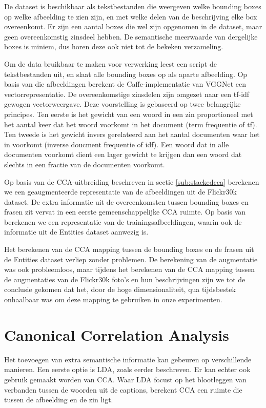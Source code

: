 De dataset is beschikbaar als tekstbestanden die weergeven welke bounding boxes op welke afbeelding te zien zijn, en met welke delen van de beschrijving elke box overeenkomt. Er zijn een aantal boxes die wel zijn opgenomen in de dataset, maar geen overeenkomstig zinsdeel hebben. De semantische meerwaarde van dergelijke boxes is miniem, dus horen deze ook niet tot de bekeken verzameling. 

Om de data bruikbaar te maken voor verwerking leest een script de tekstbestanden uit, en slaat alle bounding boxes op als aparte afbeelding. Op basis van die afbeeldingen berekent de Caffe-implementatie van VGGNet een vectorrepresentatie. De overeenkomstige zinsdelen zijn omgezet naar een tf-idf gewogen vectorweergave. Deze voorstelling is gebaseerd op twee belangrijke principes. Ten eerste is het gewicht van een woord in een zin proportioneel met het aantal keer dat het woord voorkomt in het document (term frequentie of tf). Ten tweede is het gewicht invers gerelateerd aan het aantal documenten waar het in voorkomt (inverse doucment frequentie of idf). Een woord dat in alle documenten voorkomt dient een lager gewicht te krijgen dan een woord dat slechts in een fractie van de documenten voorkomt. 

Op basis van de CCA-uitbreiding beschreven in sectie \ref{sub:stackedcca} berekenen we een geaugmenteerde representatie van de afbeeldingen uit de Flickr30k dataset. De extra informatie uit de overeenkomsten tussen bounding boxes en frasen zit vervat in een eerste gemeenschappelijke CCA ruimte. Op basis van \cite{Gong2014} berekenen we een representatie van de trainingsafbeeldingen, waarin ook de informatie uit de Entities dataset aanwezig is.

Het berekenen van de CCA mapping tussen de bounding boxes en de frasen uit de Entities dataset verliep zonder problemen. De berekening van de augmentatie was ook probleemloos, maar tijdens het berekenen van de CCA mapping tussen de augmentaties van de Flickr30k foto's en hun beschrijvingen zijn we tot de conclusie gekomen dat het, door de hoge dimensionaliteit, qua tijdsbestek onhaalbaar was om deze mapping te gebruiken in onze experimenten. 



\section{Canonical Correlation Analysis}
Het toevoegen van extra semantische informatie kan gebeuren op verschillende manieren. Een eerste optie is LDA, zoals eerder beschreven. Er kan echter ook gebruik gemaakt worden van CCA. Waar LDA focust op het blootleggen van verbanden tussen de woorden uit de captions, berekent CCA een ruimte die tussen de afbeelding en de zin ligt.

